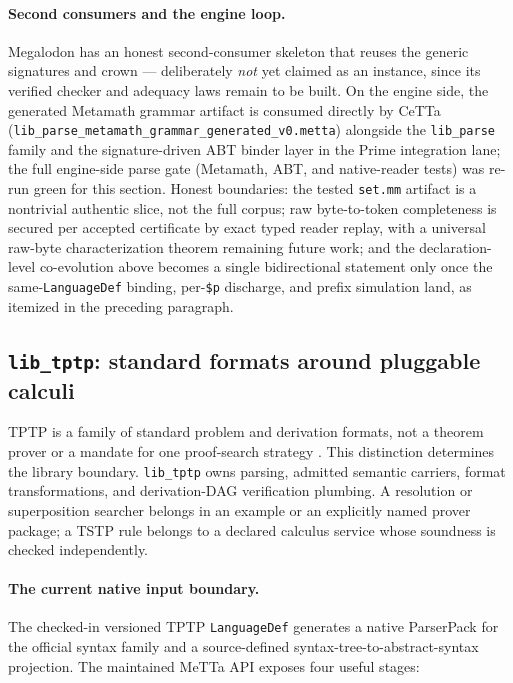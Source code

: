 \documentclass[11pt]{article}
\newcommand{\code}[1]{\texttt{#1}}
\newcommand{\CeTTa}{\textup{CeTTa}}
\begin{document}
\paragraph{Second consumers and the engine loop.}  Megalodon has an honest
second-consumer skeleton that reuses the generic signatures and crown ---
deliberately \emph{not} yet claimed as an instance, since its verified
checker and adequacy laws remain to be built.  On the engine side, the
generated Metamath grammar artifact is consumed directly by \CeTTa{}
(\code{lib\_parse\_metamath\_grammar\_generated\_v0.metta}) alongside the
\code{lib\_parse} family and the signature-driven ABT binder layer in the
Prime integration lane; the full engine-side parse gate (Metamath, ABT,
and native-reader tests) was re-run green for this section.  Honest
boundaries: the tested \code{set.mm} artifact is a nontrivial authentic
slice, not the full corpus; raw byte-to-token completeness is secured per
accepted certificate by exact typed reader replay, with a universal
raw-byte characterization theorem remaining future work; and the
declaration-level co-evolution above becomes a single bidirectional
statement only once the same-\code{LanguageDef} binding, per-\code{\$p}
discharge, and prefix simulation land, as itemized in the preceding
paragraph.

\subsection{\code{lib\_tptp}: standard formats around pluggable calculi}
\label{sec:lib-tptp}

TPTP is a family of standard problem and derivation formats, not a theorem
prover or a mandate for one proof-search strategy
\cite{tptp-language,tstp-derivations}.  This distinction determines the
library boundary.  \code{lib\_tptp} owns parsing, admitted semantic carriers,
format transformations, and derivation-DAG verification plumbing.  A
resolution or superposition searcher belongs in an example or an explicitly
named prover package; a TSTP rule belongs to a declared calculus service whose
soundness is checked independently.

\paragraph{The current native input boundary.}
The checked-in versioned TPTP \code{LanguageDef} generates a native ParserPack for
the official syntax family and a source-defined syntax-tree-to-abstract-syntax
projection.  The maintained MeTTa API exposes four useful stages:
\end{document}
